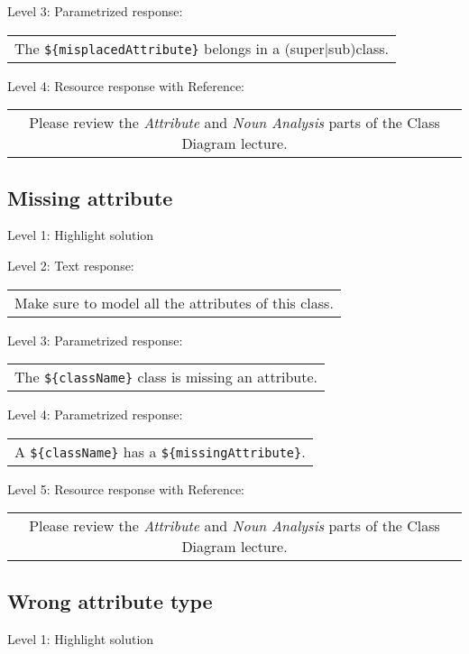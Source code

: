 \noindent Level 3: Parametrized response: \medskip

\begin{tabular}{|c}
The \verb|${misplacedAttribute}| belongs in a (super|sub)class.
\end{tabular} \medskip

\noindent Level 4: Resource response with Reference:

\begin{tabular}{|c}
Please review the \textit{Attribute} and \textit{Noun Analysis} parts of the Class Diagram lecture.
\end{tabular} \medskip


\subsection{Missing attribute}

\noindent Level 1: Highlight solution \medskip

\noindent Level 2: Text response: \medskip

\begin{tabular}{|c}
Make sure to model all the attributes of this class.
\end{tabular} \medskip

\noindent Level 3: Parametrized response: \medskip

\begin{tabular}{|c}
The \verb|${className}| class is missing an attribute.
\end{tabular} \medskip

\noindent Level 4: Parametrized response: \medskip

\begin{tabular}{|c}
A \verb|${className}| has a \verb|${missingAttribute}|.
\end{tabular} \medskip

\noindent Level 5: Resource response with Reference:

\begin{tabular}{|c}
Please review the \textit{Attribute} and \textit{Noun Analysis} parts of the Class Diagram lecture.
\end{tabular} \medskip


\subsection{Wrong attribute type}

\noindent Level 1: Highlight solution \medskip

